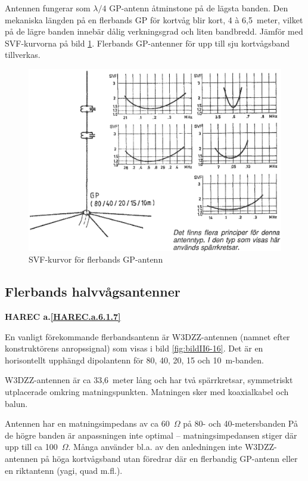 Antennen fungerar som \(\lambda/4\) GP-antenn åtminstone på de lägsta banden.
Den mekaniska längden på en flerbands GP för kortvåg blir kort, 4 à 6,5~meter,
vilket på de lägre banden innebär dålig verkningsgrad och liten bandbredd.
Jämför med SVF-kurvorna på bild \ref{fig:bildII6-15}.
Flerbands GP-antenner för upp till sju kortvågsband tillverkas.

\begin{figure}
  \includegraphics[width=\textwidth]{images/cropped_pdfs/bild_2_6-15.pdf}
  \caption{SVF-kurvor för flerbands GP-antenn}
  \label{fig:bildII6-15}
\end{figure}

\subsection{Flerbands halvvågsantenner}
\textbf{
HAREC a.\ref{HAREC.a.6.1.7}\label{myHAREC.a.6.1.7}
}
\label{W3DZZ}

En vanligt förekommande flerbandsantenn är W3DZZ-antennen (namnet
efter konstruktörens anropssignal) som visas i bild \ref{fig:bildII6-16}.
Det är en horisontellt upphängd dipolantenn för 80, 40, 20, 15 och
10~m-banden.

W3DZZ-antennen är ca 33,6~meter lång och har två spärrkretsar,
symmetriskt utplacerade omkring matningspunkten.
Matningen sker med koaxialkabel och balun.

Antennen har en matningsimpedans av ca 60~\(\Omega\) på 80- och
40-metersbanden På de högre banden är anpassningen inte optimal --
matningsimpedansen stiger där upp till ca 100~\(\Omega\).
Många använder bl.a. av den anledningen inte W3DZZ-antennen på höga
kortvågsband utan föredrar där en flerbandig GP-antenn eller en riktantenn
(yagi, quad m.fl.).

